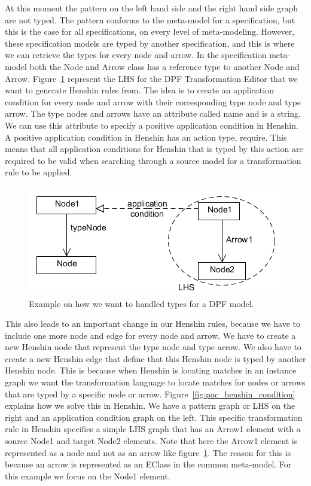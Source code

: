 At this moment the pattern on the left hand side and the right hand side graph
are not typed. The pattern conforms to the meta-model for a specification, but
this is the case for all specifications, on every level of meta-modeling. However,
these specification models are typed by another specification, and this is
where we can retrieve the types for every node and arrow. In the specification
meta-model both the Node and Arrow class has a reference type to another Node
and Arrow. Figure~\ref{fig:pac_henshin} represent the LHS for the
DPF Transformation Editor that we want to generate Henshin rules from. The idea is
to create an application condition for every node and arrow with their
corresponding type node and type arrow. The type nodes and arrows have an
attribute called name and is a string. We can use this attribute to specify a
positive application condition in Henshin. A positive application condition in
Henshin has an action type, require. This means that all application conditions
for Henshin that is typed by this action are required to be valid when searching
through a source model for a transformation rule to be applied. 

\begin{figure}[H] 
	\centering
	\includegraphics[scale=0.7]{./Figures/PAC_Henshin.png}
	\caption[How we want to handled types for a DPF model]
	{Example on how we want to handled types for a DPF model.}
	\label{fig:pac_henshin}
\end{figure}

This also leads to an important change in our Henshin rules, because we have to
include one more node and edge for every node and arrow. We have to create a new
Henshin node that represent the type node and type arrow. We also have to create
a new Henshin edge that define that this Henshin node is typed by another
Henshin node. This is because when Henshin is locating matches in an instance
graph we want the transformation language to locate matches for nodes or
arrows that are typed by a specific node or arrow. 
Figure~\ref{fig:pac_henshin_condition} explains how we solve this in Henshin.
We have a pattern graph or LHS on the right and an application condition graph
on the left. This specific transformation rule in Henshin specifies a simple LHS graph
that has an Arrow1 element with a source Node1 and target Node2 elements. Note
that here the Arrow1 element is represented as a node and not as an arrow like
figure~\ref{fig:pac_henshin}. The reason for this is because an arrow is
represented as an EClass in the common meta-model. For this example we focus on
the Node1 element.

